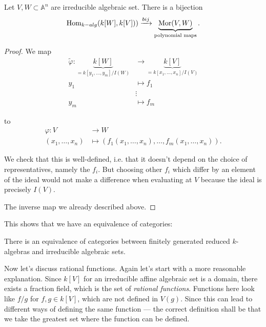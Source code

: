 \begin{proposition}
\label{proposition-irreducible-prime}
Let $V,W \subset \mathbb{A}^n$ are
irreducible algebraic set.
There is a bijection
$$
\mathop{\mathrm{Hom}}\nolimits_{k-alg}(k[W],k[V]))
\xrightarrow{bij}\underbrace{\mathop{\mathrm{Mor}}\nolimits(V,W)}_{
\text{polynomial maps}}.
$$
\end{proposition}

\begin{proof}
We map
$$
\begin{aligned}
\tilde{\varphi}:
\underbrace{k[W]}_{=k[y_1,…,y_m]/I(W)}
&\longrightarrow
\underbrace{k[V]}_{=k[x_1,…,x_n]/I(V)} \\
 y_1&\longmapsto f_1\\
&\vdots \\
y_m & \longmapsto f_m
\end{aligned}
$$

\noindent
to
$$
\begin{aligned}
\varphi: V &\longrightarrow W \\
(x_1,…,x_n) &\longmapsto (f_1(x_1,…,x_n), …,
f_m(x_1,…,x_n)).
\end{aligned}
$$

\noindent
We check that this is well-defined, i.e.
that it doesn't depend on the choice of
representatives,
namely the $f_i$. But choosing other $f_i$
which differ
by an element of the ideal would not make a
difference
when evaluating at $V$ because the ideal is
precisely $I(V)$.

The inverse map we already described above.
\end{proof}

\noindent
This shows that we have an equivalence of
categories:

\begin{lemma}
\label{lemma-algeb-varie-categ-equiv}
There is an equivalence of categories between
finitely generated reduced
$k$-algebras
and irreducible algebraic sets.
\end{lemma}


\medskip\noindent
Now let's discuss rational functions.
Again let's start with a more reasonable
explanation.
Since $k[V]$ for an irreducible affine
algebraic set is a domain,
there exists a fraction field, which is the
set of {\it rational functions}.
Functions here look like $f/g$ for $f,g \in
k[V]$,
which are not defined in $V(g)$.
Since this can lead to different ways
of defining the same function
--- the correct definition shall be that
we take the greatest set where the function
can be defined.

